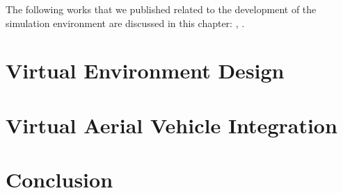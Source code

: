 The following works that we published related to the development of the simulation environment are discussed in this chapter: \cite{Smyth2018AInvestigation}, \cite{Smyth2018UsingDrones}.


\section{Virtual Environment Design}


\pagebreak
\section{Virtual Aerial Vehicle Integration}\label{sec:AirSimIntegration}


\section{Conclusion}\label{sec:VirtualEnvConclusion}
